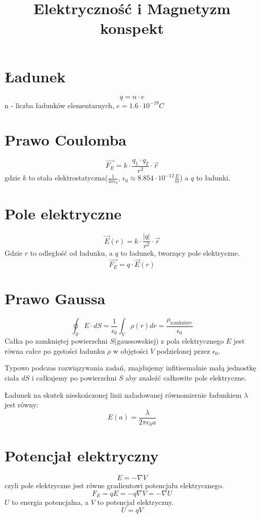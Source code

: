 \documentclass{../konspekt}
\title{Elektryczność i Magnetyzm konspekt}
\begin{document}
\begin{multicols}{2}

  \section{Ładunek}

  $$
  q = n \cdot e
  $$
  n - liczba ładunków elementarnych, $e = 1.6 \cdot 10^{-19} C$

  \section{Prawo Coulomba}

  $$
  \vec{F_E} = k \cdot \frac{q_1 \cdot q_2}{r^2} \cdot \vec{r}
  $$
  gdzie $k$ to stała elektrostatyczna($\frac{1}{4\pi\epsilon_0}$,
  $\epsilon_0\approx8.854\cdot10^{-12}\frac{E}{m}$) a $q$ to ładunki.

  \section{Pole elektryczne}

  $$
  \vec{E}(r) = k \cdot \frac{|q|}{r^2} \cdot \vec{r}
  $$
  Gdzie $r$ to odległość od ładunku, a $q$ to ładunek, tworzący pole
  elektryczne.
  $$
  \vec{F_E} = q \cdot \vec{E}(r)
  $$

  \section{Prawo Gaussa}

  $$
  \oint_S E \cdot dS = \frac{1}{\epsilon_0} \int_V \rho(r) dr =
  \frac{\rho_{\text{zamknięte}}}{\epsilon_0}
  $$
  Całka po zamkniętej powierzchni $S$(gaussowskiej) z pola
  elektrycznego $E$ jest równa całce po gęstości ładunku $\rho$ w
  objętości $V$ podzielonej przez $\epsilon_0$.

  Typowo podczas rozwiązywania zadań, znajdujemy infitisemalnie małą jednostkę
  ciała $dS$ i całkujemy po powierzchni $S$ aby znaleźć całkowite pole
  elektryczne.

  Ładunek na skutek nieskończonej linii naładowanej równomiernie
  ładunkiem $\lambda$ jest równy:
  $$
  E(a) = \frac{\lambda}{2\pi\epsilon_0 a}
  $$

  \section{Potencjał elektryczny}

  $$
  E = - \nabla V
  $$
  czyli pole elektryczne jest równe gradientowi potencjału
  elektrycznego.
  $$
  F_E = qE = -q \nabla V = - \nabla U
  $$
  $U$ to energia potencjalna, a $V$ to potencjał elektryczny.
  $$
  U = qV
  $$


\end{multicols}
\end{document}
